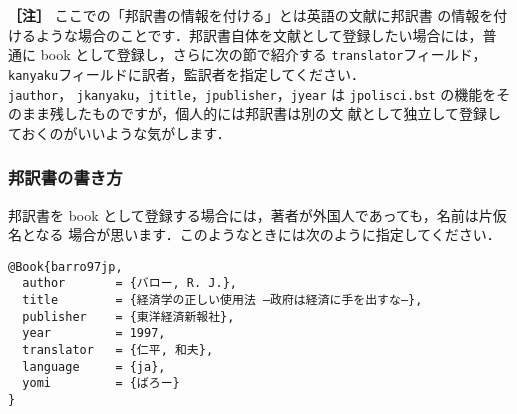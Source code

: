 \documentclass[a4j,10pt]{jarticle}
\begin{document}
\noindent \textbf{［注］} ここでの「邦訳書の情報を付ける」とは英語の文献に邦訳書
の情報を付けるような場合のことです．邦訳書自体を文献として登録したい場合には，普
通に book として登録し，さらに次の節で紹介する \texttt{translator}フィールド，
\texttt{kanyaku}フィールドに訳者，監訳者を指定してください．\\ \texttt{jauthor}，
\texttt{jkanyaku}，\texttt{jtitle}，\texttt{jpublisher}，\texttt{jyear} は
\texttt{jpolisci.bst} の機能をそのまま残したものですが，個人的には邦訳書は別の文
献として独立して登録しておくのがいいような気がします．

\subsubsection{邦訳書の書き方}
\label{sec:hoyakusho}

邦訳書を book として登録する場合には，著者が外国人であっても，名前は片仮名となる
場合が思います．このようなときには次のように指定してください．\\

\begin{screen}
 \begin{verbatim}
@Book{barro97jp,
  author       = {バロー, R. J.},
  title        = {経済学の正しい使用法 ―政府は経済に手を出すな―},
  publisher    = {東洋経済新報社},
  year         = 1997,
  translator   = {仁平, 和夫},
  language     = {ja},
  yomi         = {ばろー}
}
 \end{verbatim}
\end{screen}
\vspace*{1em}
\end{document}
